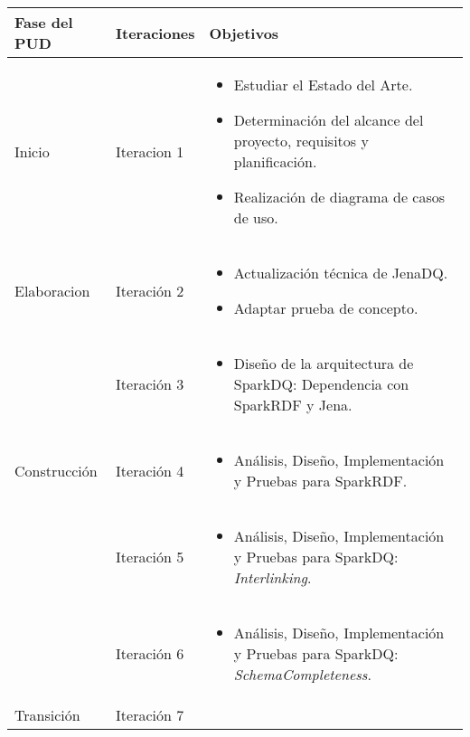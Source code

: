 
\begin{tabular}{|p{}|p{}|p{}|}

\hline

\cellcolor[gray]{0.7}Fase del \acs{PUD} &
\cellcolor[gray]{0.7}Iteraciones &
\cellcolor[gray]{0.7}Objetivos \\
\hline
Inicio & Iteracion 1 &

\begin{itemize}
\item Estudiar el Estado del Arte.
\item Determinación del alcance del proyecto, requisitos y planificación.
\item Realización de diagrama de casos de uso.
\end{itemize}

\\
\hline

Elaboracion & Iteración 2 &

\begin{itemize}

\item Actualización técnica de JenaDQ.
\item Adaptar prueba de concepto.
\end{itemize}

\\
& Iteración 3 &


\begin{itemize}
\item Diseño de la arquitectura de SparkDQ: Dependencia con SparkRDF y Jena.
\end{itemize}
\\
\hline


Construcción & Iteración 4 &


\begin{itemize}
\item Análisis, Diseño, Implementación y Pruebas para SparkRDF.
\end{itemize}
\\
& Iteración 5 &

\begin{itemize}
\item Análisis, Diseño, Implementación y Pruebas para SparkDQ: \textit{Interlinking}.
\end{itemize}
\\
& Iteración 6 &

\begin{itemize}
\item Análisis, Diseño, Implementación y Pruebas para SparkDQ: \textit{SchemaCompleteness}.
\end{itemize}
\\
\hline
Transición & Iteración 7 &


\end{tabular}
